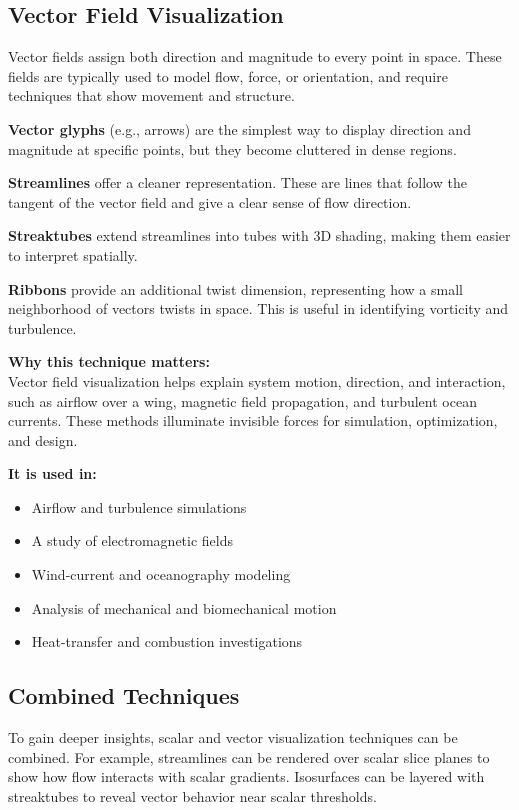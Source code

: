 \documentclass[11pt]{article}
\begin{document}
	\subsection{Vector Field Visualization}
	Vector fields assign both direction and magnitude to every point in space. These fields are typically used to model flow, force, or orientation, and require techniques that show movement and structure.
	
	\textbf{Vector glyphs} (e.g., arrows) are the simplest way to display direction and magnitude at specific points, but they become cluttered in dense regions.
	
	\textbf{Streamlines} offer a cleaner representation. These are lines that follow the tangent of the vector field and give a clear sense of flow direction.
	
	\textbf{Streaktubes} extend streamlines into tubes with 3D shading, making them easier to interpret spatially.
	
	\textbf{Ribbons} provide an additional twist dimension, representing how a small neighborhood of vectors twists in space. This is useful in identifying vorticity and turbulence.
	

	
	\vspace{1em}
\noindent
\textbf{Why this technique matters:} \\
Vector field visualization helps explain system motion, direction, and interaction, such as airflow over a wing, magnetic field propagation, and turbulent ocean currents. These methods illuminate invisible forces for simulation, optimization, and design.

\vspace{0.5em}
\noindent
\textbf{It is used in:}
\begin{itemize}
    \item Airflow and turbulence simulations
    \item A study of electromagnetic fields
    \item Wind-current and oceanography modeling
    \item Analysis of mechanical and biomechanical motion
    \item Heat-transfer and combustion investigations
\end{itemize}

	\subsection{Combined Techniques}
	To gain deeper insights, scalar and vector visualization techniques can be combined. For example, streamlines can be rendered over scalar slice planes to show how flow interacts with scalar gradients. Isosurfaces can be layered with streaktubes to reveal vector behavior near scalar thresholds.
	
\end{document}
